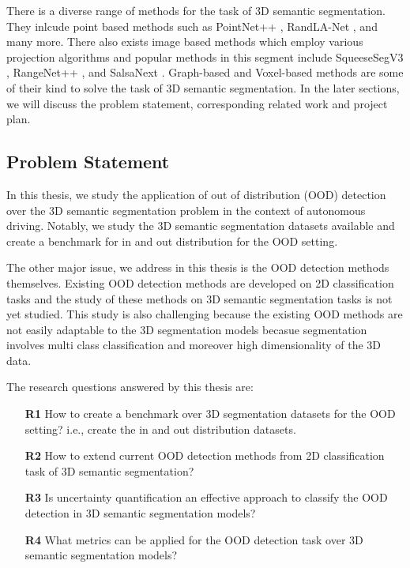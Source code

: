 \documentclass[thesis]{mas_proposal}
\begin{document}
There is a diverse range of methods for the task of 3D semantic segmentation. 
They inlcude point based methods such as PointNet++ \cite{qi2017pointnet++}, RandLA-Net \cite{Hu_2020_CVPR_Randla}, and many more.
There also exists image based methods which employ various projection algorithms and popular methods in this segment include SqueeseSegV3 \cite{Sequesesegv3_2018}, RangeNet++ \cite{Milioto2019}, and SalsaNext \cite{SalsaNext_2020}.
Graph-based and Voxel-based methods are some of their kind to solve the task of 3D semantic segmentation.
In the later sections, we will discuss the problem statement, corresponding related work and project plan.


\subsection{Problem Statement}
In this thesis, we study the application of out of distribution (OOD) detection over the 3D semantic segmentation problem in the context of autonomous driving.
Notably, we study the 3D semantic segmentation datasets available and create a benchmark for in and out distribution for the OOD setting.

The other major issue, we address in this thesis is the OOD detection methods themselves.
Existing OOD detection methods are developed on 2D classification tasks and the study of these methods on 3D semantic segmentation tasks is not yet studied. 
This study is also challenging because the existing OOD methods are not easily adaptable to the 3D segmentation models becasue segmentation involves multi class classification and moreover high dimensionality of the 3D data.
\newline

The research questions answered by this thesis are:
\begin{itemize}
    \item[\textbf{R1}] How to create a benchmark over 3D segmentation datasets for the OOD setting? i.e., create the in and out distribution datasets.
    \item[\textbf{R2}] How to extend current OOD detection methods from 2D classification task of 3D semantic segmentation?
    \item[\textbf{R3}] Is uncertainty quantification an effective approach to classify the OOD detection in 3D semantic segmentation models?
    \item[\textbf{R4}] What metrics can be applied for the OOD detection task over 3D semantic segmentation models? 
\end{itemize}
\end{document}
